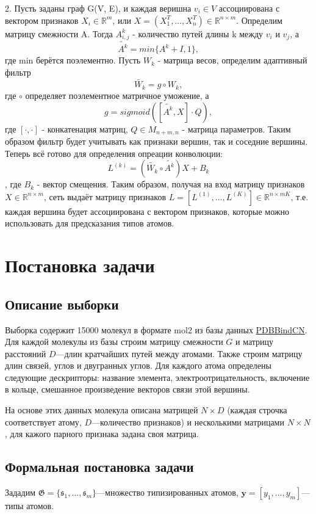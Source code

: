 \documentclass[12pt,twoside]{article}
\begin{document}
2. Пусть заданы граф G(V, E), и каждая веришна $v_i \in V$ ассоциирована с вектором признаков $X_i \in \mathbb{R}^m$, или $X=(X_1^T,\dots,X_n^T) \in \mathbb{R}^{n \times m}$. Определим матрицу смежности A. Тогда $A^k_{i,j}$ - количество путей длины k между $v_i$ и $v_j$, а $$\widetilde{A^k}=min\{A^k + I, 1\},$$ где min берётся поэлементно. Пусть $W_k$ - матрица весов, определим адаптивный фильтр $$\widetilde{W_k}=g \circ W_k,$$ где $\circ$ определяет поэлементное матричное уможение, а $$g = sigmoid([\widetilde{A^k}, X] \cdot Q),$$ где $[\cdot, \cdot]$ - конкатенация матриц, $Q \in M_{n+m, n}$ - матрица параметров. Таким образом фильтр будет учитывать как признаки вершин, так и соседние вершины. Теперь всё готово для определения опреации конволюции: $$L^{(k)} = (\widetilde{W_k} \circ \widetilde{A^k}) X + B_k$$, где $B_k$ - вектор смещения. Таким образом, получая на вход матрицу признаков $X\in \mathbb{R}^{n \times m}$, сеть выдаёт матрицу признаков $L = [L^{(1)},\dots,L^{(K)}] \in \mathbb{R}^{n \times mK}$, т.е. каждая вершина будет ассоциирована с вектором признаков, которые можно использовать для предсказания типов атомов.\cite{article20}

\section{Постановка задачи}
\subsection{Описание выборки}
Выборка содержит 15000 молекул в формате mol2 из базы данных \href{http://www.pdbbind.org.cn/}{PDBBindCN}. Для каждой молекулы из базы строим матрицу смежности $G$ и матрицу расстояний $D$---длин кратчайших путей между атомами. Также строим матрицу длин связей, углов и двугранных углов. Для каждого атома определены следующие дескрипторы: название элемента, электроотрицательность, включение в кольце, смешанное произведение векторов связи этой вершины.

На основе этих данных молекула описана матрицей $N\times D$ (каждая строчка соответствует атому, $D$---количество признаков) и несколькими матрицами $N\times N$, для кажого парного признака задана своя матрица.

\subsection{Формальная постановка задачи}
	Зададим  $\mathfrak{G} = \{\mathfrak{s}_1,...,\mathfrak{s}_m\}$---множество типизированных атомов, $\mathbf{y} = [y_1,...,y_m]$---типы атомов.
\end{document}
